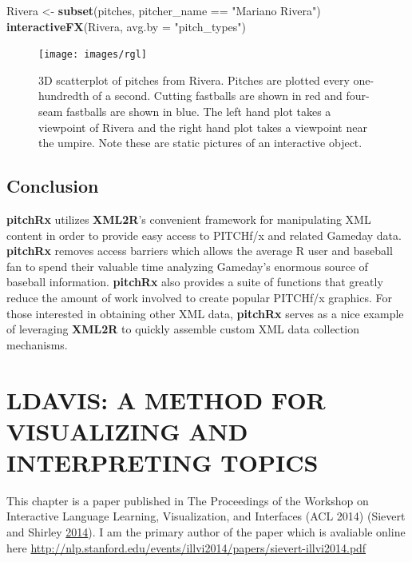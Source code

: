 \documentclass[12pt,]{isuthesis}
\newenvironment{Shaded}{\begin{snugshade}}{\end{snugshade}}
\newcommand{\KeywordTok}[1]{\textcolor[rgb]{0.13,0.29,0.53}{\textbf{{#1}}}}
\newcommand{\DataTypeTok}[1]{\textcolor[rgb]{0.13,0.29,0.53}{{#1}}}
\newcommand{\StringTok}[1]{\textcolor[rgb]{0.31,0.60,0.02}{{#1}}}
\newcommand{\NormalTok}[1]{{#1}}
\begin{document}
\begin{Shaded}
\begin{Highlighting}[]
\NormalTok{Rivera <-}\StringTok{ }\KeywordTok{subset}\NormalTok{(pitches, pitcher_name ==}\StringTok{ "Mariano Rivera"}\NormalTok{)}
\KeywordTok{interactiveFX}\NormalTok{(Rivera, }\DataTypeTok{avg.by =} \StringTok{"pitch_types"}\NormalTok{)}
\end{Highlighting}
\end{Shaded}

\begin{figure}
\centering
\texttt{[image: images/rgl]}
\caption{\label{fig:rgl}3D scatterplot of pitches from Rivera. Pitches are
plotted every one-hundredth of a second. Cutting fastballs are shown in
red and four-seam fastballs are shown in blue. The left hand plot takes
a viewpoint of Rivera and the right hand plot takes a viewpoint near the
umpire. Note these are static pictures of an interactive object.}
\end{figure}

\section{Conclusion}\label{conclusion}

\textbf{pitchRx} utilizes \textbf{XML2R}'s convenient framework for
manipulating XML content in order to provide easy access to PITCHf/x and
related Gameday data. \textbf{pitchRx} removes access barriers which
allows the average R user and baseball fan to spend their valuable time
analyzing Gameday's enormous source of baseball information.
\textbf{pitchRx} also provides a suite of functions that greatly reduce
the amount of work involved to create popular PITCHf/x graphics. For
those interested in obtaining other XML data, \textbf{pitchRx} serves as
a nice example of leveraging \textbf{XML2R} to quickly assemble custom
XML data collection mechanisms.

\chapter{LDAVIS: A METHOD FOR VISUALIZING AND INTERPRETING TOPICS}

This chapter is a paper published in The Proceedings of the Workshop on
Interactive Language Learning, Visualization, and Interfaces (ACL 2014)
(Sievert and Shirley \protect\hyperlink{ref-Sievert:2014b}{2014}). I am
the primary author of the paper which is avaliable online here
\url{http://nlp.stanford.edu/events/illvi2014/papers/sievert-illvi2014.pdf}
\end{document}
